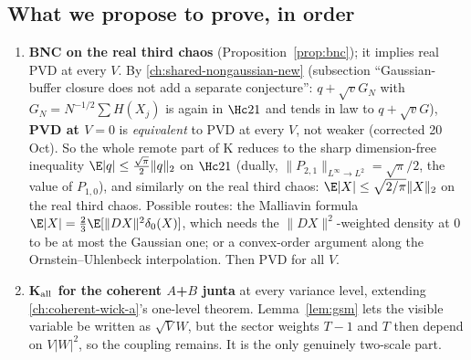 \subsection{What we propose to prove, in order}
\begin{enumerate}
\item \textbf{BNC on the real third chaos} (Proposition~\ref{prop:bnc}); it implies real PVD at every $V$. By \autoref{ch:shared-nongaussian-new} (subsection ``Gaussian-buffer closure does not add a separate conjecture'': $q+\sqrt vG_N$ with
$G_N=N^{-1/2}\sum H(X_j)$ is again in $\Hc21$ and tends in law to $q+\sqrt vG$), \textbf{PVD at $V=0$} is \emph{equivalent} to PVD at every $V$, not weaker (corrected 20 Oct). So the
whole remote part of K reduces to the sharp dimension-free inequality $\E|q|\le\frac{\sqrt\pi}2\|q\|_2$ on $\Hc21$ (dually, $\|P_{2,1}\|_{L^\infty\to L^2}=\sqrt\pi/2$, the value of
$P_{1,0}$), and similarly on the real third chaos: $\E|X|\le\sqrt{2/\pi}\|X\|_2$ on the real third chaos. Possible routes: the Malliavin formula $\E|X|=\tfrac23\E[\|DX\|^2\delta_0(X)]$, which needs the
$\|DX\|^2$-weighted density at $0$ to be at most the Gaussian one; or a convex-order argument along the Ornstein--Uhlenbeck interpolation. Then PVD for all $V$.
\item \textbf{K$_{\rm all}$ for the coherent $A$+$B$ junta} at every variance level, extending \autoref{ch:coherent-wick-a}'s one-level theorem. Lemma~\ref{lem:gsm} lets the visible
variable be written as $\sqrt VW$, but the sector weights $T-1$ and $T$ then depend on $V|W|^2$, so the coupling remains. It is the only genuinely two-scale part.
\end{enumerate}
